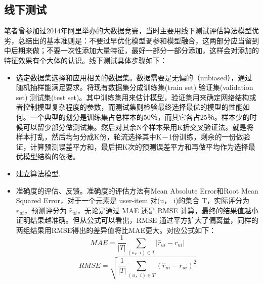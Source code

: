   \subsection{线下测试}
  笔者曾参加过2014年阿里举办的大数据竞赛，当时主要用线下测试评估算法模型优劣，总结出的基本准则是：不要过早优化模型调参和模型融合，这两部分应当留到中后期来做；不要一次性添加大量特征，最好一部分一部分添加，这样会对添加的特征效果有个大体的认识。线下测试具体步骤如下：
  \begin{itemize}
  \item 选定数据集选择和应用相关的数据集。数据需要是无偏的（unbiased），通过随机抽样能满足要求。将现有数据集分成训练集(train set) 验证集(validation set) 测试集(test set)。其中训练集用来估计模型，验证集用来确定网络结构或者控制模型复杂程度的参数，而测试集则检验最终选择最优的模型的性能如何。一个典型的划分是训练集占总样本的50％，而其它各占25％。样本少的时候可以留少部分做测试集。然后对其余N个样本采用K折交叉验证法。就是将样本打乱，然后均匀分成K份，轮流选择其中K－1份训练，剩余的一份做验证，计算预测误差平方和，最后把K次的预测误差平方和再做平均作为选择最优模型结构的依据。
  \item 建立算法模型.
  \item 准确度的评估、反馈。准确度的评估方法有Mean Absolute Error和Root Mean Squared Error，对于一个元素是 user-item 对(u， i)的集合 T，实际评分为 $r_{ui}$，预测评分为 $\hat{r}_{ui}$，无论是通过 MAE 还是 RMSE 计算，最终的结果值越小证明结果越准确。但从公式可以看出，RMSE 通过平方扩大了偏离量，同样的两组结果用RMSE得出的差异值将比MAE更大。对应公式如下：
  \begin{equation}
    MAE = \frac{1}{|T |} \sum_{(u，i)\in T}|\hat{r}_{ui}-r_{ui}|
    \label{cosine-similiarity}
  \end{equation}
  \begin{equation}
    RMSE = \sqrt{\frac{1}{|T |} \sum_{(u，i)\in T}(\hat{r}_{ui}-r_{ui})^2}
    \label{cosine-similiarity}
  \end{equation}
  \end{itemize}

